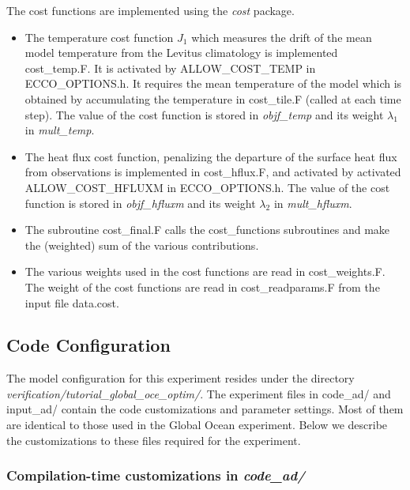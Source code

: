 The cost functions are implemented using the {\it cost} package.

\begin{itemize}

\item The temperature cost function $J_1$ which measures the drift of the mean
model temperature from the Levitus climatology is implemented cost\_temp.F.
It is activated by ALLOW\_COST\_TEMP in ECCO\_OPTIONS.h. It requires the mean
temperature of the model which is obtained by accumulating the temperature in
cost\_tile.F (called at each time step).
The value of the cost function is stored in {\it objf\_temp} and its weight
$\lambda_1$ in {\it mult\_temp}.

\item The heat flux cost function, penalizing the departure of the surface
heat flux from observations is implemented in cost\_hflux.F, and activated by
activated ALLOW\_COST\_HFLUXM in ECCO\_OPTIONS.h. The value of the cost
function is stored in {\it objf\_hfluxm} and its weight $\lambda_2$ in
{\it mult\_hfluxm}.

\item The subroutine cost\_final.F calls the cost\_functions subroutines
and make the (weighted) sum of the various contributions.

\item The various weights used in the cost functions are read in
cost\_weights.F. The weight of the cost functions are read in
cost\_readparams.F from the input file data.cost.    

\end{itemize}


\subsection{Code Configuration}
\label{www:tutorials}
\label{SEC:eg_fourl_code_config}

The model configuration for this experiment resides under the directory
{\it verification/tutorial\_global\_oce\_optim/}.  The experiment files in
code\_ad/ and input\_ad/ contain the code customizations and parameter
settings. Most of them are identical to those used in the Global Ocean
experiment. Below we describe the customizations to these files required for
the experiment.

\subsubsection{Compilation-time customizations in {\it code\_ad/}}

